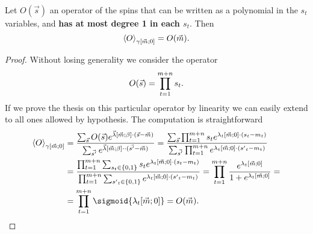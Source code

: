 \begin{lemma} \label{lem:operator-mean-gamma}
  Let \(O{(\vec{s})}\) an operator of the spins that can be written as a polynomial in the \(s_t\)
  variables, and \textbf{has at most degree 1 in each \(s_t\)}. Then
  \[
    \left\langle O\right\rangle_{\gamma{\left[\vec{m};0\right]}} = O{(\vec{m})}.
  \]
  \begin{proof}
    Without losing generality we consider the operator
    \[O{(\vec{s})} = \prod_{t=1}^{m+n} s_t.\]
    If we prove the thesis on this particular operator by linearity we can easily extend to all ones
    allowed by hypothesis.
    The computation is straightforward
    \begin{align*}
      \Gmean{O}{\vec{m}}{0} 
        &= \frac{\sums O{(\vec{s})} e^{\Lambd{\vec{m}}{\beta}\cdot(\vec{s}-\vec{m})}}
               {\sum_{\vec{s'}}e^{\Lambd{\vec{m}}{\beta}\cdot \cdot (\vec{s'}-\vec{m})}}
         = \frac{\sums \prodt s_t e^{\lgtmz \cdot (s_t-m_t)}}
                {\sum_{\vec{s'}} \prodt e^{\lgtmz \cdot ({s'}_t-m_t)}} \\
       &= \frac{\prodt \sumst s_t e^{\lgtmz \cdot (s_t-m_t)}}
               {\prodt \sumstprim e^{\lgtmz \cdot ({s'}_t-m_t)}}
        = \prodt \frac{e^{\lgtmz}}{1+e^{\lgtmz}} = \\
       &= \prodt \sigmoid{\lgtmz} = O{(\vec{m})}.
    \end{align*}
  \end{proof}
\end{lemma}
